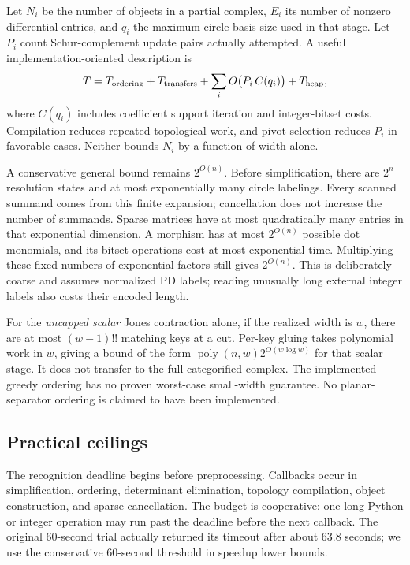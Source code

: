 \documentclass[11pt]{article}
\newcommand{\poly}{\operatorname{poly}}
\begin{document}
Let $N_i$ be the number of objects in a partial complex, $E_i$ its number of
nonzero differential entries, and $q_i$ the maximum circle-basis size used in
that stage. Let $P_i$ count Schur-complement update pairs actually attempted.
A useful implementation-oriented description is
\[
 T= T_{\rm ordering}+T_{\rm transfers}
    +\sum_i O\bigl(P_i\,C(q_i)\bigr)
    +T_{\rm heap},
\]
where $C(q_i)$ includes coefficient support iteration and integer-bitset costs.
Compilation reduces repeated topological work, and pivot selection reduces
$P_i$ in favorable cases. Neither bounds $N_i$ by a function of width alone.

A conservative general bound remains $2^{O(n)}$. Before simplification, there
are $2^n$ resolution states and at most exponentially many circle labelings.
Every scanned summand comes from this finite expansion; cancellation does not
increase the number of summands. Sparse matrices have at most quadratically
many entries in that exponential dimension. A morphism has at most $2^{O(n)}$
possible dot monomials, and its bitset operations cost at most exponential time.
Multiplying these fixed numbers of exponential factors still gives
$2^{O(n)}$. This is deliberately coarse and assumes normalized PD labels;
reading unusually long external integer labels also costs their encoded length.

For the \emph{uncapped scalar} Jones contraction alone, if the realized width
is $w$, there are at most $(w-1)!!$ matching keys at a cut. Per-key gluing takes
polynomial work in $w$, giving a bound of the form
$\poly(n,w)2^{O(w\log w)}$ for that scalar stage. It does not transfer to the
full categorified complex. The implemented greedy ordering has no proven
worst-case small-width guarantee. No planar-separator ordering is claimed to
have been implemented.

\subsection{Practical ceilings}

The recognition deadline begins before preprocessing. Callbacks occur in
simplification, ordering, determinant elimination, topology compilation,
object construction, and sparse cancellation. The budget is cooperative:
one long Python or integer operation may run past the deadline before the
next callback. The original 60-second trial actually returned its timeout
after about 63.8 seconds; we use the conservative 60-second threshold in
speedup lower bounds.
\end{document}
